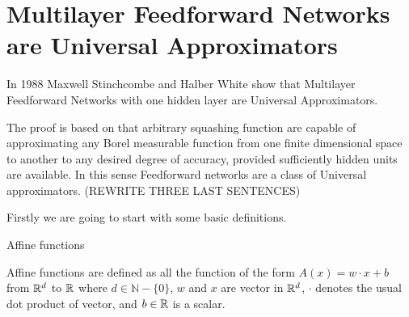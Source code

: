  


    
\section{Multilayer Feedforward Networks are Universal Approximators}

In 1988 Maxwell Stinchcombe and Halber White show that Multilayer
Feedforward Networks with one hidden layer are Universal Approximators.  

The proof is based on that arbitrary squashing function are capable of approximating
any Borel measurable function from one finite dimensional space to another to any desired 
degree of accuracy, provided sufficiently hidden units are available. In this sense 
Feedforward networks are a class of Universal approximators. 
(REWRITE THREE LAST SENTENCES)

Firstly we are going to start with some basic definitions. 

\begin{definition}Affine functions  

    Affine functions are defined as all the 
    function of the form $A(x) = w \cdot x + b$ 
    from $\mathbb{R} ^d$ to $\mathbb{R}$
    where $d \in \mathbb{N} - \{ 0 \}$, $w$ and $x$  are vector in $\mathbb{R}^d$,  
    $\cdot$ 
    denotes the usual dot product of vector, and $b \in \mathbb{R}$ is a scalar.  
    
\end{definition}

